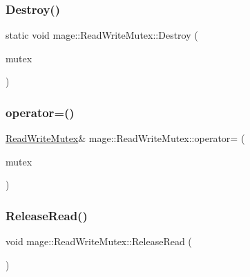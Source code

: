 \subsubsection{\texorpdfstring{Destroy()}{Destroy()}}
{\footnotesize\ttfamily static void mage\+::\+Read\+Write\+Mutex\+::\+Destroy (\begin{DoxyParamCaption}\item[{\hyperlink{classmage_1_1_read_write_mutex}{Read\+Write\+Mutex} $\ast$}]{mutex }\end{DoxyParamCaption})\hspace{0.3cm}{\ttfamily [static]}}

\hypertarget{classmage_1_1_read_write_mutex_a3fab1becc4527dc69fdd6cd38b627501}{}\label{classmage_1_1_read_write_mutex_a3fab1becc4527dc69fdd6cd38b627501} 
\subsubsection{\texorpdfstring{operator=()}{operator=()}}
{\footnotesize\ttfamily \hyperlink{classmage_1_1_read_write_mutex}{Read\+Write\+Mutex}\& mage\+::\+Read\+Write\+Mutex\+::operator= (\begin{DoxyParamCaption}\item[{const \hyperlink{classmage_1_1_read_write_mutex}{Read\+Write\+Mutex} \&}]{mutex }\end{DoxyParamCaption})\hspace{0.3cm}{\ttfamily [private]}}

\hypertarget{classmage_1_1_read_write_mutex_a0af5059a9bd16abd8a21b15e7ebe053d}{}\label{classmage_1_1_read_write_mutex_a0af5059a9bd16abd8a21b15e7ebe053d} 
\subsubsection{\texorpdfstring{Release\+Read()}{ReleaseRead()}}
{\footnotesize\ttfamily void mage\+::\+Read\+Write\+Mutex\+::\+Release\+Read (\begin{DoxyParamCaption}{ }\end{DoxyParamCaption})\hspace{0.3cm}{\ttfamily [private]}}

